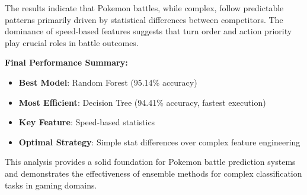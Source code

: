 \documentclass[12pt,a4paper]{article}
\begin{document}
The results indicate that Pokemon battles, while complex, follow predictable patterns primarily driven by statistical differences between competitors. The dominance of speed-based features suggests that turn order and action priority play crucial roles in battle outcomes.

\textbf{Final Performance Summary:}
\begin{itemize}
    \item \textbf{Best Model}: Random Forest (95.14\% accuracy)
    \item \textbf{Most Efficient}: Decision Tree (94.41\% accuracy, fastest execution)
    \item \textbf{Key Feature}: Speed-based statistics
    \item \textbf{Optimal Strategy}: Simple stat differences over complex feature engineering
\end{itemize}

This analysis provides a solid foundation for Pokemon battle prediction systems and demonstrates the effectiveness of ensemble methods for complex classification tasks in gaming domains.
\end{document}
